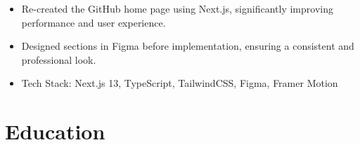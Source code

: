 \documentclass[11pt,a4paper,sans]{moderncv}
\begin{document}
{
\begin{itemize}[leftmargin=0.6cm, label={\textbullet}]
    \item Re-created the GitHub home page using Next.js, significantly improving performance and user experience.
    \item Designed sections in Figma before implementation, ensuring a consistent and professional look.
    \item Tech Stack: Next.js 13, TypeScript, TailwindCSS, Figma, Framer Motion
\end{itemize}
}

\section{Education}
\end{document}
